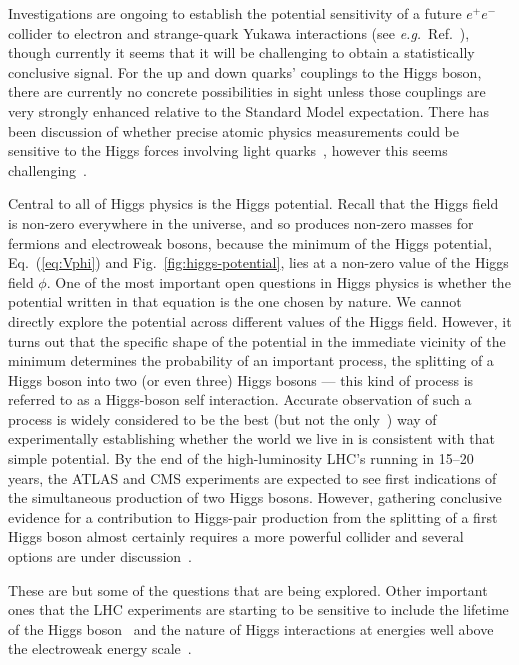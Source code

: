 \documentclass[12pt]{article}
\begin{document}
Investigations are ongoing to establish the potential sensitivity of a
future $e^+e^-$ collider to electron and strange-quark Yukawa
interactions (see {\it e.g.}\ Ref.~\cite{dEnterria:2021xij}), though
currently it seems that it will be challenging to obtain a
statistically conclusive signal.
%
For the up and down quarks' couplings to the Higgs boson, there are currently no concrete
possibilities in sight unless those couplings are very strongly enhanced
relative to the Standard Model
expectation. There has been
  discussion of whether precise atomic physics measurements could be
  sensitive to the Higgs forces involving light quarks~\cite{Delaunay:2016brc},
  however this seems challenging~\cite{Flambaum:2017onb}.

Central to all of Higgs physics is the Higgs potential.
Recall that the Higgs field is non-zero everywhere in the universe, and so produces
non-zero masses for fermions and electroweak bosons, because the
minimum of the Higgs potential, Eq.~(\ref{eq:Vphi}) and
Fig.~\ref{fig:higgs-potential}, lies at a non-zero value of the Higgs
field $\phi$.
One of the most important open questions in Higgs physics is whether
the potential written in that equation is the one chosen by nature.
%
We cannot directly explore the potential across different values of the
Higgs field.
%
However, it turns out that the specific shape of the potential in the
immediate vicinity of 
the minimum
determines the probability of an important process,
the splitting of a Higgs boson into two (or even
three) Higgs bosons --- this kind of process is referred to as a
Higgs-boson self interaction.
%
Accurate observation of such a process is widely considered to be the
best (but not the only~\cite{McCullough:2013rea}) way of
experimentally establishing whether the world we live in is consistent
with that simple potential.
%
By the end of the high-luminosity LHC's running in 15--20 years, the ATLAS and CMS
experiments are expected to see first indications of the simultaneous
production of two Higgs bosons.
%
However, gathering conclusive evidence for a contribution to Higgs-pair
production  from the splitting of a first Higgs boson almost
certainly requires a more powerful
collider and several options are under
discussion~\cite{FCC:2018vvp,CEPCStudyGroup:2018rmc,Roloff:2018dqu,Franceschini:2021aqd,Delahaye:2019omf}.


These are but some of the questions that are being explored.
%
Other important ones that the LHC experiments are starting to be
sensitive to include the lifetime of the Higgs
boson~\cite{Caola:2013yja,Campbell:2013una,ATLAS:2018jym,CMS:2022ley}
and the nature of Higgs interactions at energies well above the
electroweak energy scale~\cite{ATLAS:2020jwz,CMS:2020zge}.
\end{document}
